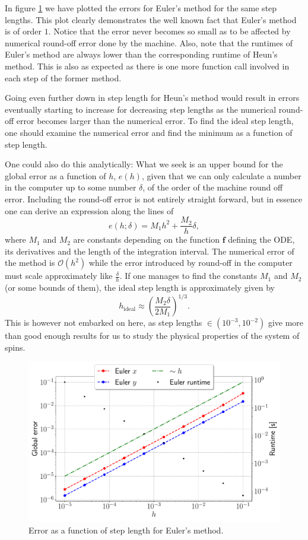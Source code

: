 In figure \ref{fig:err_euler} we have plotted the errors for Euler's method for the same step lengths. This plot clearly demonstrates the well known fact that Euler's method is of order $1$. Notice that the error never becomes so small as to be affected by numerical round-off error done by the machine. Also, note that the runtimes of Euler's method are always lower than the corresponding runtime of Heun's method. This is also as expected as there is one more function call involved in each step of the former method. 

\begin{remark}
	Going even further down in step length for Heun's method would result in errors eventually starting to increase for decreasing step lengths as the numerical round-off error becomes larger than the numerical error. To find the ideal step length, one should examine the numerical error and find the minimum as a function of step length. 
	
	One could also do this analytically: What we seek is an upper bound for the global error as a function of $h$, $e(h)$, given that we can only calculate a number in the computer up to some number $\delta$, of the order of the machine round off error. Including the round-off error is not entirely straight forward, but in essence one can derive an expression along the lines of 
	$$
		e(h; \delta) = M_1 h^2 + \frac{M_2}{h} \delta, 
	$$ 
	where $M_1$ and $M_2$ are constants depending on the function $\mathbf{f}$ defining the ODE, its derivatives and the length of the integration interval. The numerical error of the method is $\mathcal{O}(h^2)$ while the error introduced by round-off in the computer must scale approximately like $\frac{\delta}{h}$. If one manages to find the constants $M_1$ and $M_2$ (or some bounds of them), the ideal step length is approximately given by 
	$$
		h_{\text{ideal}} \approx \left( \frac{M_2 \delta}{2 M_1}  \right)^{1/3}.
	$$
	This is however not embarked on here, as step lengths $\in (10^{-3},10^{-2})$ give more than good enough results for us to study the physical properties of the system of spins.
\end{remark}
 
\begin{figure}[htb]
	\centering
	\includegraphics[width =0.8\columnwidth]{../fig/err_euler.pdf}
	\caption{Error as a function of step length for Euler's method.}
	\label{fig:err_euler}
\end{figure}

